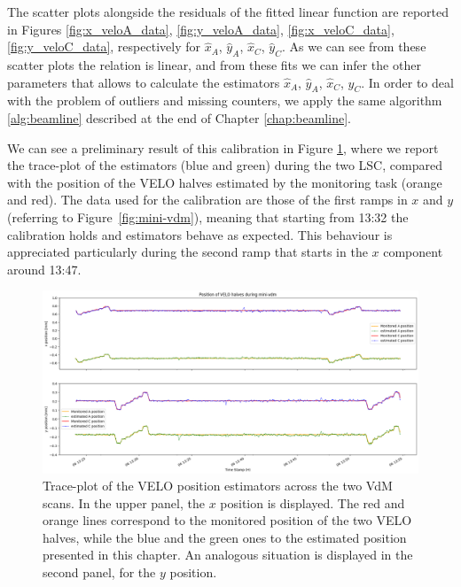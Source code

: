 The scatter plots alongside the residuals of the fitted linear function are reported in Figures \ref{fig:x_veloA_data}, \ref{fig:y_veloA_data}, \ref{fig:x_veloC_data}, \ref{fig:y_veloC_data}, respectively for $\hat{x}_A$, $\hat{y}_A$, $\hat{x}_C$, $\hat{y}_C$. As we can see from these scatter plots the relation is linear, and from these fits we can infer the other parameters that allows to calculate the estimators $\hat{x}_A$, $\hat{y}_A$, $\hat{x}_C$, $\hat{y}_C$. In order to deal with the problem of outliers and missing counters, we apply the same algorithm \ref{alg:beamline} described at the end of Chapter \ref{chap:beamline}. 

We can see a preliminary result of this calibration in Figure \ref{fig:traceplot_xy}, where we report the trace-plot of the estimators (blue and green) during the two LSC, compared with the position of the VELO halves estimated by the monitoring task (orange and red). The data used for the calibration are those of the first ramps in $x$ and $y$ (referring to Figure~\ref{fig:mini-vdm}), meaning that starting from 13:32 the calibration holds and estimators behave as expected. This behaviour is appreciated particularly during the second ramp that starts in the $x$ component around 13:47.

\begin{figure}
    \centering
    \includegraphics[width=\textwidth]{figures/traceplot_xy.png}
    \caption{Trace-plot of the VELO position estimators across the two VdM scans. In the upper panel, the $x$ position is displayed. The red and orange lines correspond to the monitored position of the two VELO halves, while the blue and the green ones to the estimated position presented in this chapter. An analogous situation is displayed in the second panel, for the $y$ position.}
    \label{fig:traceplot_xy}
\end{figure}

